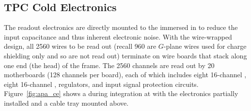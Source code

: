 \begin{comment}
\begin{dunetable}[APA interface control documents]{lr}{tab:apa_interface_docdb}
{Summary of interface control documents being developed.}  
  Interface Document & DUNE DocDB number \\\colhline 
  Interface to TPC electronics & 6670 \\ \colhline 
  Interface to photon detector system & 6667 \\ \colhline
  Interface to drift high voltage system & 6673 \\ \colhline
  Interface to DAQ & 6676 \\ \colhline
  Interface to slow controls and cryogenics infrastructure & 6679 \\\specialrule{1.5pt}{1pt}{1pt}
  Integration facility interface & 7021 \\ \colhline
  Facility interfaces (Detector Hall, Cryostat, and Cryogenics) & 6967 \\ \colhline
  Installation interface & 6994 \\ \colhline
  Calibration interface & 7048 \\\specialrule{1.5pt}{1pt}{1pt}
  Software computing interface & 7102 \\ \colhline
  Physics interface & 7075 \\ \colhline
\end{dunetable}
\end{comment}


\subsection{TPC Cold Electronics}
\label{sec:fdsp-apa-intfc-elec}

The  readout electronics are directly mounted to the  immersed in  to reduce the input capacitance and thus inherent electronic noise.  With the wire-wrapped design, all \num{2560} wires to be read out (recall \num{960} are $G$-plane wires used for charge shielding only and so are not read out) terminate on wire boards that stack along one end (the head) of the  frame.  The \num{2560} channels are read out by \num{20}  motherboards (\num{128} channels per board), each of which includes eight \num{16}-channel  , eight \num{16}-channel  ,  regulators, and input signal protection circuits.  Figure~\ref{fig:apa_ce} shows a   during integration at  with the  electronics partially installed and a cable tray mounted above. 

